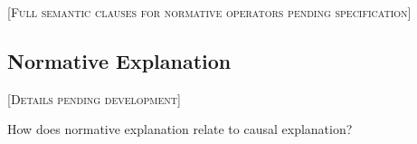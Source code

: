\documentclass[../LogosReference.tex]{subfiles}
\begin{document}
\textsc{[Full semantic clauses for normative operators pending specification]}


\subsection{Normative Explanation}\label{sec:normative-explanation}

\textsc{[Details pending development]}

\begin{question}
How does normative explanation relate to causal explanation?
\end{question}
\end{document}
